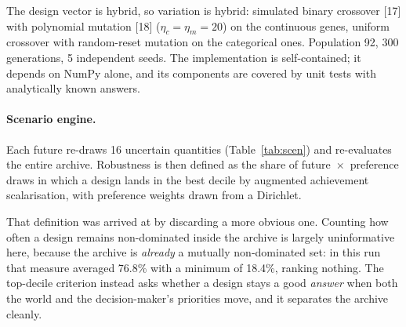 \documentclass[11pt,a4paper]{article}
\begin{document}
The design vector is hybrid, so variation is hybrid: simulated binary
crossover [17] with polynomial mutation [18] ($\eta_c = \eta_m = 20$) on the
continuous genes, uniform crossover with random-reset mutation on the
categorical ones.
Population 92, 300 generations,
5 independent seeds. The implementation is self-contained;
it depends on NumPy alone, and its components are covered by unit tests with
analytically known answers.

\paragraph{Scenario engine.} Each future re-draws
16 uncertain quantities (Table~\ref{tab:scen}) and
re-evaluates the entire archive. Robustness is then defined as the share of
future~$\times$~preference draws in which a design lands in the best decile by
augmented achievement scalarisation, with preference weights drawn from a
Dirichlet.

That definition was arrived at by discarding a more obvious one. Counting how
often a design remains non-dominated inside the archive is largely
uninformative here, because the archive is \emph{already} a mutually non-dominated set:
in this run that measure averaged
76.8\% with a minimum of 18.4\%, ranking
nothing. The top-decile criterion instead asks whether a design stays a good
\emph{answer} when both the world and the decision-maker's priorities move,
and it separates the archive cleanly.
\end{document}
